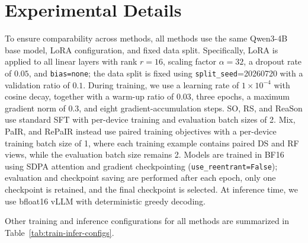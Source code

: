 \section{Experimental Details}
\label{app:experimental-details}


To ensure comparability across methods, all methods use the same Qwen3-4B base model, 
LoRA configuration, and fixed data split. Specifically, LoRA is applied to all linear 
layers with rank $r\!=\!16$, scaling factor $\alpha\!=\!32$, a dropout rate of $0.05$, 
and \texttt{bias=none}; the data split is fixed using \texttt{split\_seed}=20260720 with 
a validation ratio of $0.1$. 
During training, we use a learning rate of $1\!\times\!10^{-4}$ 
with cosine decay, together with a warm-up ratio of $0.03$, three epochs, a maximum gradient 
norm of $0.3$, and eight gradient-accumulation steps. 
SO, RS, and ReaSon use standard SFT with per-device training and evaluation
batch sizes of 2. Mix, PaIR, and RePaIR instead use paired training objectives
with a per-device training batch size of 1, where each training example contains
paired DS and RF views, while the evaluation batch size remains 2.
Models are trained in BF16 using SDPA attention and gradient checkpointing 
(\texttt{use\_reentrant=False}); evaluation and checkpoint saving are performed after 
each epoch, only one checkpoint is retained, and the final checkpoint is selected. 
At inference time, we use bfloat16 vLLM with deterministic greedy decoding.

Other training and inference configurations for all methods are summarized in 
Table~\ref{tab:train-infer-configs}.

